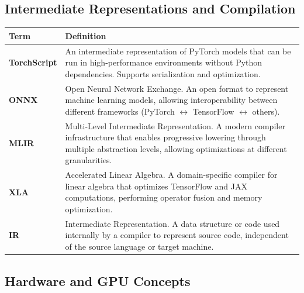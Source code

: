 \documentclass[11pt]{article}
\begin{document}
\subsection{Intermediate Representations and Compilation}

\begin{longtable}{|p{}|p{}|}
\hline
\textbf{Term} & \textbf{Definition} \\
\hline
\endhead
\textbf{TorchScript} & An intermediate representation of PyTorch models that can be run in high-performance environments without Python dependencies. Supports serialization and optimization. \\
\hline
\textbf{ONNX} & Open Neural Network Exchange. An open format to represent machine learning models, allowing interoperability between different frameworks (PyTorch $\leftrightarrow$ TensorFlow $\leftrightarrow$ others). \\
\hline
\textbf{MLIR} & Multi-Level Intermediate Representation. A modern compiler infrastructure that enables progressive lowering through multiple abstraction levels, allowing optimizations at different granularities. \\
\hline
\textbf{XLA} & Accelerated Linear Algebra. A domain-specific compiler for linear algebra that optimizes TensorFlow and JAX computations, performing operator fusion and memory optimization. \\
\hline
\textbf{IR} & Intermediate Representation. A data structure or code used internally by a compiler to represent source code, independent of the source language or target machine. \\
\hline
\end{longtable}

\subsection{Hardware and GPU Concepts}
\end{document}
